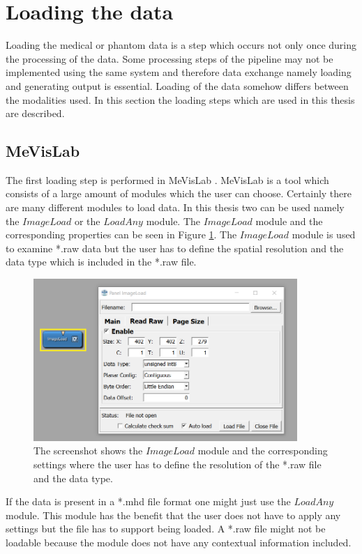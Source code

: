 \section{Loading the data}

Loading the medical or phantom data is a step which occurs not only once during the processing of the data. Some processing steps of the pipeline may not be implemented using the same system and therefore data exchange namely loading and generating output is essential. Loading of the data somehow differs between the modalities used. In this section the loading steps which are used in this thesis are described.\newline

\subsection{MeVisLab}

The first loading step is performed in MeVisLab \cite{AGMeVisLab}. MeVisLab is a tool which consists of a large amount of modules which the user can choose. Certainly there are many different modules to load data. In this thesis two can be used namely the $ImageLoad$ or the $LoadAny$ module. The $ImageLoad$ module and the corresponding properties can be seen in Figure \ref{fig:meImageLoad}. The $ImageLoad$ module is used to examine *.raw data but the user has to define the spatial resolution and the data type which is included in the *.raw file.

\begin{figure} [!htb]
    \centering
	\includegraphics[width=10cm]{content/images/meImageLoad}
	\caption{The screenshot shows the $ImageLoad$ module and the corresponding settings where the user has to define the resolution of the *.raw file and the data type.} 
	\label{fig:meImageLoad}
\end{figure}

If the data is present in a *.mhd file format one might just use the $LoadAny$ module. This module has the benefit that the user does not have to apply any settings but the file has to support being loaded. A *.raw file might not be loadable because the module does not have any contextual information included.

